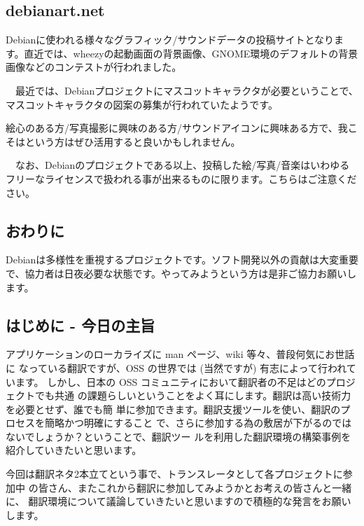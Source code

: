 \documentclass[mingoth,a4paper]{jsarticle}
\begin{document}
\subsection{debianart.net}

 Debianに使われる様々なグラフィック/サウンドデータの投稿サイトとなります。直近では、wheezyの起動画面の背景画像、GNOME環境のデフォルトの背景画像などのコンテストが行われました。

　最近では、Debianプロジェクトにマスコットキャラクタが必要ということで、
マスコットキャラクタの図案の募集が行われていたようです。

 絵心のある方/写真撮影に興味のある方/サウンドアイコンに興味ある方で、我こそはという方はぜひ活用すると良いかもしれません。

　なお、Debianのプロジェクトである以上、投稿した絵/写真/音楽はいわゆるフリーなライセンスで扱われる事が出来るものに限ります。こちらはご注意ください。

\subsection{おわりに}

 Debianは多様性を重視するプロジェクトです。ソフト開発以外の貢献は大変重要で、協力者は日夜必要な状態です。やってみようという方は是非ご協力お願いします。



\subsection{はじめに - 今日の主旨}
アプリケーションのローカライズに man ページ、wiki 等々、普段何気にお世話に
なっている翻訳ですが、OSS の世界では (当然ですが) 有志によって行われています。
しかし、日本の OSS コミュニティにおいて翻訳者の不足はどのプロジェクトでも共通
の課題らしいということをよく耳にします。翻訳は高い技術力を必要とせず、誰でも簡
単に参加できます。翻訳支援ツールを使い、翻訳のプロセスを簡略かつ明確にすること
で、さらに参加する為の敷居が下がるのではないでしょうか？ということで、翻訳ツー
ルを利用した翻訳環境の構築事例を紹介していきたいと思います。

今回は翻訳ネタ2本立てという事で、トランスレータとして各プロジェクトに参加中
の皆さん、またこれから翻訳に参加してみようかとお考えの皆さんと一緒に、
翻訳環境について議論していきたいと思いますので積極的な発言をお願いします。
\end{document}
